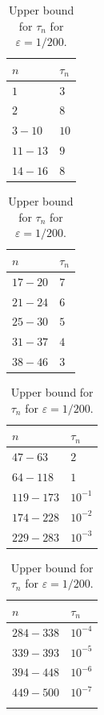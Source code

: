 \documentclass[12pt]{amsart}
\begin{document}
\begin{table}[H]
\centering
    \begin{tabular}{ | l | l |}
    \hline
    $n$ & $\tau_n $ \\  
    \hline
    $1$& $3$ \\
    \hline
    $2$& $8$ \\
    \hline
    $3-10$& $10$ \\
    \hline
    $11-13$& $9$ \\
    \hline
    $14-16$& $8$ \\
    \hline
    \end{tabular}
    \begin{tabular}{ | l | l | }
    \hline
    $n$ & $\tau_n $\\  
    \hline
    $17-20$& $7$ \\
    \hline
    $21-24$ & $6$ \\
    \hline
    $25-30$ & $5$ \\
    \hline
    $31-37$ & $4$ \\
    \hline
    $38-46$ & $3$ \\
    \hline
    \end{tabular}
    \begin{tabular}{ | l | l |}
    \hline
    $n$ & $\tau_n $ \\
    \hline
    $47-63$ & $2$ \\
    \hline
    $64-118$ & $1$ \\
    \hline
    $119-173$ & $10^{-1}$ \\
    \hline
    $174-228$ & $10^{-2}$ \\
    \hline
    $229-283$ & $10^{-3}$ \\
    \hline
    \end{tabular}
    \begin{tabular}{ | l | l |}
    \hline
    $n$ & $\tau_n $ \\  
    \hline
    $284-338$ & $10^{-4}$ \\
    \hline
    $339-393$ & $10^{-5}$ \\
    \hline
    $394-448$& $10^{-6}$ \\
    \hline
    $449-500$ &$10^{-7}$\\
    \hline
     &\\
    \hline
    \end{tabular}
\caption{Upper bound for $\tau_n$ for $\varepsilon=1/200$.}  
\label{tab:tau}  
\end{table}
\end{document}

